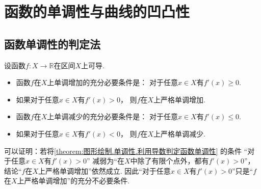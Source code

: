 \section{函数的单调性与曲线的凹凸性}
\subsection{函数单调性的判定法}
\begin{theorem}[函数的单调性]\label{theorem:图形绘制.单调性.利用导数判定函数单调性}
设函数\(f\colon X\to\mathbb{R}\)在区间\(X\)上可导.
\begin{itemize}
	\item 函数\(f\)在\(X\)上单调增加的充分必要条件是：
	对于任意\(x \in X\)有\(f'(x) \geq 0\).

	\item 如果对于任意\(x \in X\)有\(f'(x) > 0\)，
	则\(f\)在\(X\)上严格单调增加.

	\item 函数\(f\)在\(X\)上单调减少的充分必要条件是：
	对于任意\(x \in X\)有\(f'(x) \leq 0\).

	\item 如果对于任意\(x \in X\)有\(f'(x) < 0\)，
	则\(f\)在\(X\)上严格单调减少.
\end{itemize}
\end{theorem}
\begin{remark}
可以证明：若将\cref{theorem:图形绘制.单调性.利用导数判定函数单调性} 的条件
“对于任意\(x \in X\)有\(f'(x) > 0\)”
减弱为“在\(X\)中除了有限个点外，都有\(f'(x)>0\)”，
结论“\(f\)在\(X\)上严格单调增加”依然成立.
因此“对于任意\(x \in X\)有\(f'(x) > 0\)”只是“\(f\)在\(X\)上严格单调增加”的充分不必要条件.
\end{remark}

